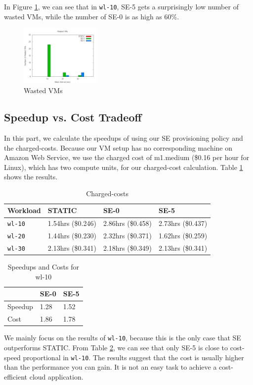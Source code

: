 In Figure \ref{figure_vm_wasted}, we can see that in \texttt{wl-10},
SE-5 gets a surprisingly low number of wasted VMs, while the number of
SE-0 is as high as 60\%.

\begin{figure}[!t]
\centering
\includegraphics[width=0.35\textwidth]{pictures/vm-wasted.png}
\caption{Wasted VMs}
\label{figure_vm_wasted}
\end{figure}


\subsection{Speedup vs. Cost Tradeoff}
In this part, we calculate the speedups of using our SE provisioning
policy and the charged-costs. Because our VM setup has no
corresponding machine on Amazon Web Service, we use the charged cost
of m1.medium (\$0.16 per hour for Linux), which has two compute units,
for our charged-cost calculation. Table \ref{table_chargedcosts} shows
the results.

\begin{table}
\caption{Charged-costs}
\label{table_chargedcosts}
\centering
\begin{tabular}{|l|l|l|l|}
\hline
Workload & STATIC & SE-0 & SE-5 \\
\hline
\texttt{wl-10} & 1.54hrs (\$0.246) & 2.86hrs (\$0.458) & 2.73hrs (\$0.437) \\
\hline
\texttt{wl-20} & 1.44hrs (\$0.230) & 2.32hrs (\$0.371) & 1.62hrs (\$0.259) \\
\hline
\texttt{wl-30} & 2.13hrs (\$0.341) & 2.18hrs (\$0.349) & 2.13hrs (\$0.341) \\
\hline
\end{tabular}
\end{table}

\begin{table}
\caption{Speedups and Costs for wl-10}
\label{table_speedupcost}
\centering
\begin{tabular}{|l|l|l|}
\hline
 & SE-0 & SE-5 \\
\hline
Speedup & 1.28 & 1.52 \\
\hline
Cost & 1.86 & 1.78 \\
\hline
\end{tabular}
\end{table}

We mainly focus on the results of \texttt{wl-10}, because this is the
only case that SE outperforms STATIC. From Table
\ref{table_speedupcost}, we can see that only SE-5 is close to
cost-speed proportional in \texttt{wl-10}. The results suggest that
the cost is usually higher than the performance you can gain. It is
not an easy task to achieve a cost-efficient cloud application.
